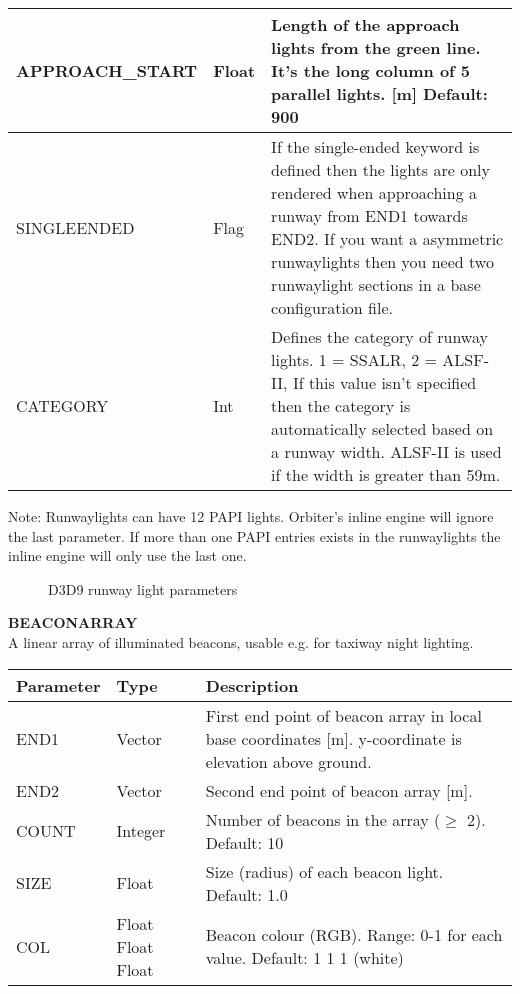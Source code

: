 \documentclass[Orbiter Developer Manual.tex]{subfiles}
\begin{document}
\begin{longtable}{ |p{}|p{}|p{}| }
	\hline\rule{0pt}{2ex}
	APPROACH\_START & Float & Length of the approach lights from the green line. It's the long column of 5 parallel lights. [m] Default: 900\\
	\hline\rule{0pt}{2ex}
	SINGLEENDED & Flag & If the single-ended keyword is defined then the lights are only rendered when approaching a runway from END1 towards END2. If you want a asymmetric runwaylights then you need two runwaylight sections in a base configuration file.\\
	\hline\rule{0pt}{2ex}
	CATEGORY & Int & Defines the category of runway lights. 1 = SSALR, 2 = ALSF-II, If this value isn't specified then the category is automatically selected based on a runway width. ALSF-II is used if the width is greater than 59m.\\
	\hline
	\end{longtable}

\noindent
Note: Runwaylights can have 12 PAPI lights. Orbiter's inline engine will ignore the last parameter. If more than one PAPI entries exists in the runwaylights the inline engine will only use the last one.

\begin{figure}[H]
	\centering
	\caption{D3D9 runway light parameters}
\end{figure}

\noindent
\textbf{BEACONARRAY}\\
A linear array of illuminated beacons, usable e.g. for taxiway night lighting.

	\begin{longtable}{ |p{}|p{}|p{}| }
	\hline\rule{0pt}{2ex}
	\textbf{Parameter} & \textbf{Type} & \textbf{Description}\\
	\hline\rule{0pt}{2ex}
	END1 & Vector & First end point of beacon array in local base coordinates [m]. y-coordinate is elevation above ground.\\
	\hline\rule{0pt}{2ex}
	END2 & Vector & Second end point of beacon array [m].\\
	\hline\rule{0pt}{2ex}
	COUNT & Integer & Number of beacons in the array ($\geq$ 2). Default: 10\\
	\hline\rule{0pt}{2ex}
	SIZE & Float & Size (radius) of each beacon light. Default: 1.0\\
	\hline\rule{0pt}{2ex}
	COL & Float Float Float & Beacon colour (RGB). Range: 0-1 for each value. Default: 1 1 1 (white)\\
	\hline
	\end{longtable}
\end{document}
